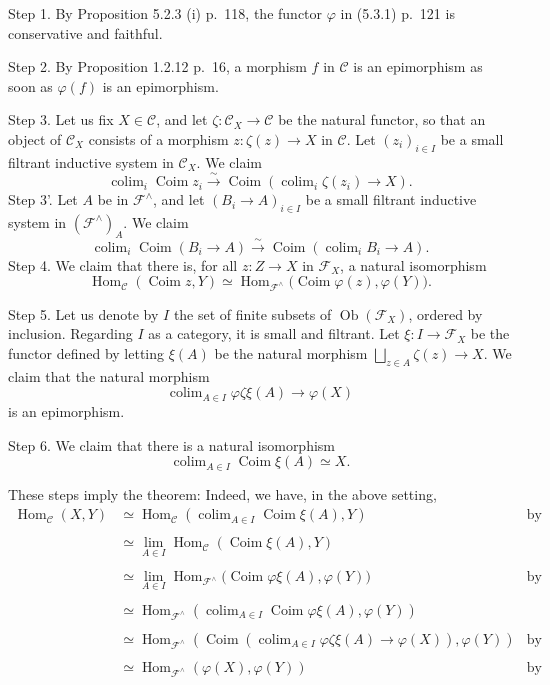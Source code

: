\documentclass[12pt]{article}
\theoremstyle{remark}
\theoremstyle{definition}
\newcommand{\n}{\noindent}
\newcommand{\C}{\mathcal C}
\newcommand{\F}{\mathcal F}
\newcommand{\p}{\varphi}
\DeclareMathOperator*{\coli}{colim}
\DeclareMathOperator{\Coim}{Coim}
\DeclareMathOperator{\Hom}{Hom}
\DeclareMathOperator{\Ob}{Ob}
\begin{document}
\n Step 1. By Proposition 5.2.3 (i) p.~118, the functor $\p$ in (5.3.1) p.~121 is conservative and faithful.

\n Step 2. By Proposition 1.2.12 p.~16, a morphism $f$ in $\C$ is an epimorphism as soon as $\p(f)$ is an epimorphism.

\n Step 3. Let us fix $X\in\C$, and let $\zeta:\C_X\to\C$ be the natural functor, so that an object of $\C_X$ consists of a morphism $z:\zeta(z)\to X$ in $\C$. Let $(z_i)_{i\in I}$ be a small filtrant inductive system in $\C_X$. We claim 
$$
\coli_i\Coim z_i\xrightarrow{\sim}
\Coim\left(\coli_i\zeta(z_i)\to X\right).
$$
\n Step 3'. Let $A$ be in $\F^\wedge$, and let $(B_i\to A)_{i\in I}$ be a small filtrant inductive system in $(\F^\wedge)_A$. We claim 
$$
\coli_i\Coim(B_i\to A)\xrightarrow{\sim}
\Coim\left(\coli_iB_i\to A\right).
$$
Step 4. We claim that there is, for all $z:Z\to X$ in $\F_X$, a natural isomorphism 
$$\Hom_\C(\Coim z,Y)\simeq\Hom_{\F^\wedge}\Big(\Coim\p(z),\p(Y)\Big).
$$ 

\n Step 5. Let us denote by $I$ the set of finite subsets of $\Ob(\F_X)$, ordered by inclusion. Regarding $I$ as a category, it is small and filtrant. Let $\xi:I\to\F_X$ be the functor defined by letting $\xi(A)$ be the natural morphism $\bigsqcup_{z\in A}\zeta(z)\to X$. We claim that the natural morphism 
$$
\coli_{A\in I}\p\zeta\xi(A)\to\p(X) 
$$ 
is an epimorphism.

\n Step 6. We claim that there is a natural isomorphism 
$$
\coli_{A\in I}\Coim\xi(A)\simeq X. 
$$

These steps imply the theorem: Indeed, we have, in the above setting, 
%
\begin{align*} 
%
\Hom_\C(X,Y)&\simeq\Hom_\C\left(\coli_{A\in I}\Coim\xi(A),Y\right)&\text{by Step 6}\\ \\ 
%
&\simeq\lim_{A\in I}\Hom_\C(\Coim\xi(A),Y)\\ \\ 
% 
&\simeq\lim_{A\in I}\Hom_{\F^\wedge}\Big(\Coim\p\xi(A),\p(Y)\Big)&\text{by Step 4}\\ \\ 
%
&\simeq\Hom_{\F^\wedge}\left(\coli_{A\in I}\Coim\p\xi(A),\p(Y)\right)\\ \\ 
%
&\simeq\Hom_{\F^\wedge}\left(\Coim\left(\coli_{A\in I}\p\zeta\xi(A)\to\p(X)\right),\p(Y)\right)&\text{by Step 3'}\\ \\ 
%
&\simeq\Hom_{\F^\wedge}(\p(X),\p(Y))&\text{by Step 5.}
%
\end{align*} 
%
\end{document}
